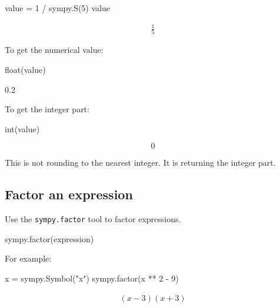 \begin{pyin}
\begin{pyin}
value = 1 / sympy.S(5)
value
\end{pyin}




\begin{equation*}
\begin{split}\displaystyle \frac{1}{5}\end{split}
\end{equation*}




To get the numerical value:




\begin{pyin}
float(value)
\end{pyin}





\begin{pyin}
0.2
\end{pyin}





To get the integer part:




\begin{pyin}
int(value)
\end{pyin}

\[
0
\]

This is not rounding to the nearest integer. It is returning the integer part.


\subsection{Factor an expression}

Use the \texttt{sympy.factor} tool to factor expressions.

\begin{pyin}
sympy.factor(expression)
\end{pyin}

For example:

\begin{pyin}
x = sympy.Symbol("x")
sympy.factor(x ** 2 - 9)
\end{pyin}


\begin{equation*}
\begin{split}\displaystyle \left(x - 3\right) \left(x + 3\right)\end{split}
\end{equation*}


\end{pyin}
